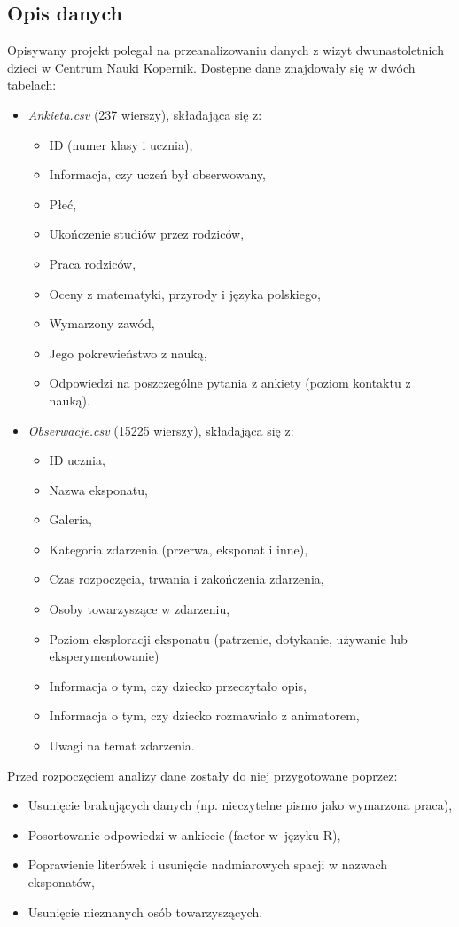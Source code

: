 \documentclass[conference]{IEEEtran}
\begin{document}
\subsection{Opis danych}
Opisywany projekt polegał na przeanalizowaniu danych z wizyt dwunastoletnich dzieci w Centrum Nauki Kopernik. Dostępne dane znajdowały się w dwóch tabelach:
\begin{itemize}
\item \textit{Ankieta.csv} (237 wierszy), składająca się z: \begin{itemize}
\item ID (numer klasy i ucznia),
\item Informacja, czy uczeń był obserwowany,
\item Płeć,
\item Ukończenie studiów przez rodziców,
\item Praca rodziców,
\item Oceny z matematyki, przyrody i języka polskiego,
\item Wymarzony zawód,
\item Jego pokrewieństwo z nauką,
\item Odpowiedzi na poszczególne pytania z ankiety (poziom kontaktu z nauką).
\end{itemize}
\item \textit{Obserwacje.csv} (15225 wierszy), składająca się z: \begin{itemize}
\item ID ucznia,
\item Nazwa eksponatu,
\item Galeria,
\item Kategoria zdarzenia (przerwa, eksponat i inne),
\item Czas rozpoczęcia, trwania i zakończenia zdarzenia,
\item Osoby towarzyszące w zdarzeniu,
\item Poziom eksploracji eksponatu (patrzenie, dotykanie, używanie lub eksperymentowanie)
\item Informacja o tym, czy dziecko przeczytało opis,
\item Informacja o tym, czy dziecko rozmawiało z animatorem,
\item Uwagi na temat zdarzenia.
\end{itemize}
\end{itemize}
Przed rozpoczęciem analizy dane zostały do niej przygotowane poprzez:
\begin{itemize}
\item Usunięcie brakujących danych (np. nieczytelne pismo jako wymarzona praca),
\item Posortowanie odpowiedzi w ankiecie (factor w~języku R),
\item Poprawienie literówek i usunięcie nadmiarowych spacji w nazwach eksponatów,
\item Usunięcie nieznanych osób towarzyszących.
\end{itemize}
\end{document}
